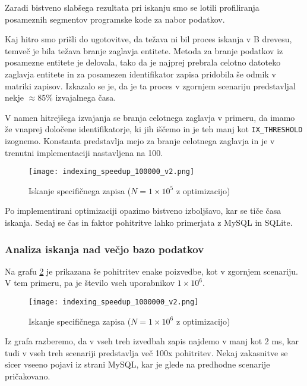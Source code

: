 \documentclass[a4paper,12pt,openright]{book}
\begin{document}
    Zaradi bistveno slabšega rezultata pri iskanju smo se lotili profiliranja posameznih segmentov programske kode za nabor podatkov.

    Kaj hitro smo prišli do ugotovitve, da težava ni bil proces iskanja v B drevesu, temveč je bila težava branje zaglavja entitete. Metoda za branje podatkov iz posamezne entitete je delovala, tako da je najprej prebrala celotno datoteko zaglavja entitete in za posamezen identifikator zapisa pridobila še odmik v matriki zapisov. Izkazalo se je, da je ta proces v zgornjem scenariju predstavljal nekje $\approx 85$\% izvajalnega časa.

    V namen hitrejšega izvajanja se branja celotnega zaglavja v primeru, da imamo že vnaprej določene identifikatorje, ki jih iščemo in je teh manj kot {\tt IX\_THRESHOLD} izognemo. Konstanta predstavlja mejo za branje celotnega zaglavja in je v trenutni implementaciji nastavljena na \num{100}.
    
    \begin{figure}[H]
        \centerline{\texttt{[image: indexing\_speedup\_100000\_v2.png]}}
        \caption{Iskanje specifičnega zapisa ($N = 1 \times 10^5$ z optimizacijo)}
        \label{idx_speedup}
    \end{figure}

    \noindent
    Po implementirani optimizaciji opazimo bistveno izboljšavo, kar se tiče časa iskanja. Sedaj se čas in faktor pohitritve lahko primerjata z MySQL in SQLite.

    \subsubsection{Analiza iskanja nad večjo bazo podatkov}

    Na grafu \ref{idx_speedup_2} je prikazana še pohitritev enake poizvedbe, kot v zgornjem scenariju. V tem primeru, pa je število vseh uporabnikov $1 \times 10^6$.
    
    \begin{figure}[H]
        \centerline{\texttt{[image: indexing\_speedup\_1000000\_v2.png]}}
        \caption{Iskanje specifičnega zapisa ($N = 1 \times 10^6$ z optimizacijo)}
        \label{idx_speedup_2}
    \end{figure}

    \noindent
    Iz grafa razberemo, da v vseh treh izvedbah zapis najdemo v manj kot 2 ms, kar tudi v vseh treh scenariji predstavlja več 100x pohitritev. Nekaj zakasnitve se sicer vseeno pojavi iz strani MySQL, kar je glede na predhodne scenarije pričakovano.
\end{document}
